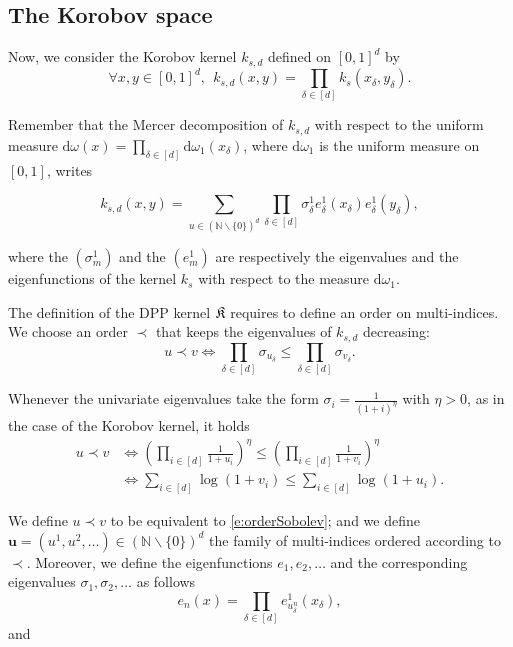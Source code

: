 \documentclass[twoside,11pt]{book}
\numberwithin{theorem}{chapter}
\numberwithin{definition}{chapter}
\numberwithin{proposition}{chapter}
\numberwithin{corollary}{chapter}
\numberwithin{example}{chapter}
\numberwithin{lemma}{chapter}
\numberwithin{assumption}{chapter}
\begin{document}
\subsection{The Korobov space}
Now, we consider the Korobov kernel $k_{s,d}$ defined on $[0,1]^{d}$ by
\begin{equation}
\forall x, y \in [0,1]^{d}, \:\:k_{s,d}(x,y) = \prod\limits_{\delta \in [d]} k_{s}(x_{\delta},y_{\delta}).
\end{equation}

Remember that the Mercer decomposition of $k_{s,d}$ with respect to the uniform measure $\mathrm{d}\omega(x) = \prod\limits_{\delta \in [d]} \mathrm{d}\omega_{1}(x_{\delta})$, where $\mathrm{d}\omega_{1}$ is the uniform measure on $[0,1]$, writes

\begin{equation}
k_{s,d}(x,y) = \sum\limits_{u \in (\mathbb{N}\smallsetminus \{0\})^{d}} \prod\limits_{\delta \in [d]} \sigma_{\delta}^{1} e_{\delta}^{1}(x_{\delta}) e_{\delta}^{1}(y_{\delta}),
\end{equation}

where the $(\sigma_{m}^{1})$ and the $(e_{m}^{1})$ are respectively the eigenvalues and the eigenfunctions of the kernel $k_{s}$ with respect to the measure $\mathrm{d}\omega_{1}$.


The definition of the DPP kernel $\frak K$ requires to define an order on multi-indices. We choose an order $\prec$ that keeps the eigenvalues of $k_{s,d}$ decreasing:
\begin{equation}
u \prec v \iff  \prod\limits_{\delta \in [d]} \sigma_{u_{\delta}} \leq \prod\limits_{\delta \in [d]} \sigma_{v_{\delta}}.
\end{equation}


 Whenever the univariate eigenvalues take the form $\sigma_{i} = \frac{1}{(1+i)^{\eta}}$ with $\eta >0$, as in the case of the Korobov kernel, it holds
\begin{align}
u \prec v  & \Leftrightarrow \left(\prod\limits_{i \in [d]} \frac{1}{1+u_{i}} \right)^{\eta} \leq \left(\prod\limits_{i \in [d]} \frac{1}{1+v_{i}} \right)^{\eta} \\
& \Leftrightarrow \sum\limits_{i \in [d]} \log(1+v_{i})  \leq \sum\limits_{i \in [d]} \log(1+u_{i}) .
\label{e:orderSobolev}
\end{align}

We define $u \prec v$ to be equivalent to \eqref{e:orderSobolev}; and we define $\textbf{u}= (u^{1}, u^{2},\dots)\in (\mathbb{N} \smallsetminus \{0\})^d$ the family of multi-indices ordered according to $\prec$. Moreover, we define the eigenfunctions $e_{1}, e_{2}, \dots$ and the corresponding eigenvalues $\sigma_{1}, \sigma_{2}, \dots$ as follows
\begin{equation}
e_{n}(x) = \prod\limits_{\delta \in [d]} e_{u_{\delta}^{n}}^{1}(x_{\delta}),
\end{equation}
and 
\end{document}
